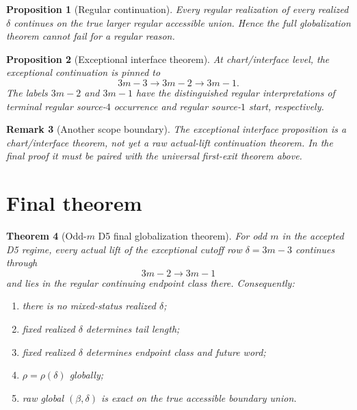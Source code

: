 \documentclass[11pt]{article}
\newtheorem{theorem}{Theorem}
\newtheorem{proposition}[theorem]{Proposition}
\newtheorem{remark}[theorem]{Remark}
\begin{document}
\begin{proposition}[Regular continuation]
Every regular realization of every realized $\delta$ continues on the true
larger regular accessible union. Hence the full globalization theorem cannot
fail for a regular reason.
\end{proposition}

\begin{proposition}[Exceptional interface theorem]
At chart/interface level, the exceptional continuation is pinned to
\[
3m-3 \to 3m-2 \to 3m-1.
\]
The labels $3m-2$ and $3m-1$ have the distinguished regular interpretations of
terminal regular source-$4$ occurrence and regular source-$1$ start,
respectively.
\end{proposition}

\begin{remark}[Another scope boundary]
The exceptional interface proposition is a chart/interface theorem, not yet a
raw actual-lift continuation theorem. In the final proof it must be paired with
the universal first-exit theorem above.
\end{remark}

\section{Final theorem}

\begin{theorem}[Odd-$m$ D5 final globalization theorem]
For odd $m$ in the accepted D5 regime, every actual lift of the exceptional
cutoff row $\delta=3m-3$ continues through
\[
3m-2 \to 3m-1
\]
and lies in the regular continuing endpoint class there.
Consequently:
\begin{enumerate}[label=\textup{(\arabic*)},leftmargin=2.2em]
\item there is no mixed-status realized $\delta$;
\item fixed realized $\delta$ determines tail length;
\item fixed realized $\delta$ determines endpoint class and future word;
\item $\rho = \rho(\delta)$ globally;
\item raw global $(\beta,\delta)$ is exact on the true accessible boundary
union.
\end{enumerate}
\end{theorem}
\end{document}
